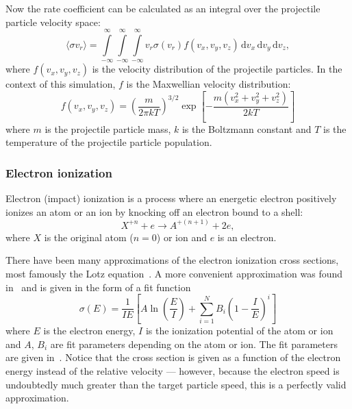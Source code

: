 \documentclass[a4paper,twoside,12pt]{article}
\begin{document}
Now the rate coefficient can be calculated as an integral over the projectile particle velocity space:
\begin{equation}
    \langle \sigma v_r \rangle = \int\limits_{-\infty}^\infty \int\limits_{-\infty}^\infty \int\limits_{-\infty}^\infty v_r \sigma(v_r) f(v_x, v_y, v_z)\,\mathrm{d}v_x\,\mathrm{d}v_y\,\mathrm{d}v_z,
\end{equation}
where $f(v_x, v_y, v_z)$ is the velocity distribution of the projectile particles. In the context of this simulation, $f$ is the Maxwellian velocity distribution:
\begin{equation}
    f(v_x, v_y, v_z) = \left(\frac{m}{2\pi kT}\right)^{3/2} \exp \left[ -\frac{m(v_x^2 + v_y^2 + v_z^2)}{2kT} \right]
\end{equation}
where $m$ is the projectile particle mass, $k$ is the Boltzmann constant and $T$ is the temperature of the projectile particle population.

\subsubsection{Electron ionization}
Electron (impact) ionization is a process where an energetic electron positively ionizes an atom or an ion by knocking off an electron bound to a shell:
\[
    X^{+n} + e \rightarrow A^{+(n+1)} + 2e,
\]
where $X$ is the original atom ($n=0$) or ion and $e$ is an electron.

There have been many approximations of the electron ionization cross sections, most famously the Lotz equation~\cite{lotz}. A more convenient approximation was found in~\cite{recommended_ionization} and is given in the form of a fit function
\begin{equation}
    \label{eq:ionization_fit}
    \sigma(E) = \frac{1}{IE} \left[ A \ln \left(\frac{E}{I}\right) + \sum\limits_{i=1}^N
    B_i \left(1-\frac{I}{E}\right)^i \right]
\end{equation}
where $E$ is the electron energy, $I$ is the ionization potential of the atom or ion and $A$, $B_i$ are fit parameters depending on the atom or ion. The fit parameters are given in~\cite{recommended_ionization}. Notice that the cross section is given as a function of the electron energy instead of the relative velocity --- however, because the electron speed is undoubtedly much greater than the target particle speed, this is a perfectly valid approximation.
\end{document}
